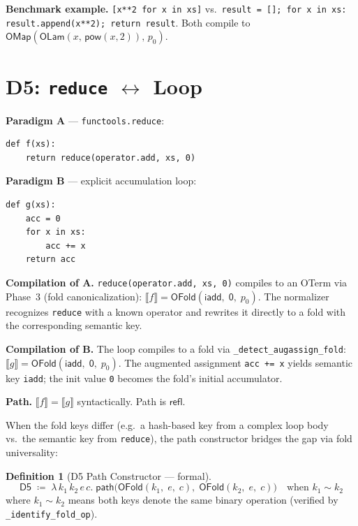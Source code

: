 \documentclass[11pt,a4paper]{report}
\theoremstyle{definition}
\newtheorem{definition}{Definition}[chapter]
\theoremstyle{plain}
\newcommand{\den}[1]{\llbracket #1 \rrbracket}
\begin{document}
\textbf{Benchmark example.}
\texttt{[x**2 for x in xs]} vs.\
\texttt{result = []; for x in xs: result.append(x**2); return result}.
Both compile to $\mathsf{OMap}(\mathsf{OLam}(x,\,
\mathsf{pow}(x, 2)),\, p_0)$.


\section{D5: \texttt{reduce} $\leftrightarrow$ Loop}
\label{sec:d5}

\textbf{Paradigm A} --- \texttt{functools.reduce}:
\begin{lstlisting}
def f(xs):
    return reduce(operator.add, xs, 0)
\end{lstlisting}

\textbf{Paradigm B} --- explicit accumulation loop:
\begin{lstlisting}
def g(xs):
    acc = 0
    for x in xs:
        acc += x
    return acc
\end{lstlisting}

\textbf{Compilation of A.}
\texttt{reduce(operator.add, xs, 0)} compiles to an OTerm via
Phase~3 (fold canonicalization):
$\den{f} = \mathsf{OFold}(\mathsf{iadd},\; \mathsf{0},\; p_0)$.
The normalizer recognizes \texttt{reduce} with a known operator
and rewrites it directly to a fold with the corresponding semantic
key.

\textbf{Compilation of B.}
The loop compiles to a fold via \texttt{\_detect\_augassign\_fold}:
$\den{g} = \mathsf{OFold}(\mathsf{iadd},\; \mathsf{0},\; p_0)$.
The augmented assignment \texttt{acc += x} yields semantic key
\texttt{iadd}; the init value \texttt{0} becomes the fold's initial
accumulator.

\textbf{Path.}
$\den{f} = \den{g}$ syntactically.  Path is $\mathsf{refl}$.

When the fold keys differ (e.g.\ a hash-based key from a complex
loop body vs.\ the semantic key from \texttt{reduce}), the path
constructor bridges the gap via fold universality:

\begin{definition}[D5 Path Constructor --- formal]
\label{def:d5-path}
\[
  \mathsf{D5} \;\coloneqq\; \lambda\, k_1\, k_2\, e\, c.\;
  \mathsf{path}\!\big(
    \mathsf{OFold}(k_1,\; e,\; c),\;
    \mathsf{OFold}(k_2,\; e,\; c)
  \big)
  \quad\text{when } k_1 \sim k_2
\]
where $k_1 \sim k_2$ means both keys denote the same binary
operation (verified by \texttt{\_identify\_fold\_op}).
\end{definition}
\end{document}
